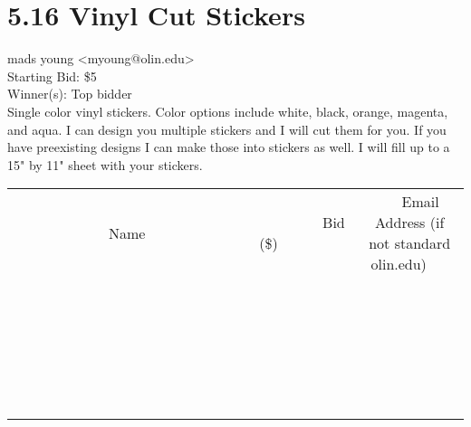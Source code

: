 \documentclass[11pt]{article}
\begin{document}
					\section*{5.16 Vinyl Cut Stickers}
					mads young <myoung@olin.edu> \\
					Starting Bid: \$5 \\
					Winner(s): Top bidder \\
					Single color vinyl stickers. Color options include white, black, orange, magenta, and aqua. I can design you multiple stickers and I will cut them for you. If you have preexisting designs I can make those into stickers as well. I will fill up to a 15" by 11" sheet with your stickers. \\
					[6ex]
					\begin{tabular}{c c c}
						~~~~~~~~~~~~~Name~~~~~~~~~~~~~ & ~~~~~~~~~Bid (\$)~~~~~~~~~ & ~~~Email Address (if not standard olin.edu)~~~ \\
				
 & & \\
\hline
 & & \\
\hline
 & & \\
\hline
 & & \\
\hline
 & & \\
\hline
 & & \\
\hline
 & & \\
\hline
 & & \\
\hline
 & & \\
\hline
 & & \\
\hline
 & & \\
\hline
 & & \\
\hline
 & & \\
\hline
 & & \\
\hline
 & & \\
\hline
 & & \\
\hline
 & & \\
\hline
 & & \\
\hline
 & & \\
\hline
 & & \\
\hline
 & & \\
\hline
 & & \\
\hline
 & & \\
\hline
 & & \\
\hline
 & & \\
\hline
 & & \\
\hline
					\end{tabular}
					\clearpage
				
\end{document}
